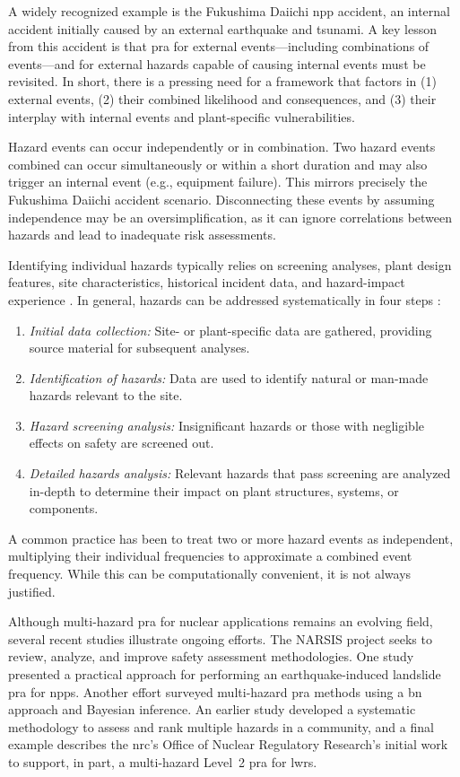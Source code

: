 A widely recognized example is the Fukushima Daiichi \acrshort{npp} accident, an internal accident initially caused by an external earthquake and tsunami. A key lesson from this accident is that \acrshort{pra} for external events---including combinations of events---and for external hazards capable of causing internal events must be revisited. In short, there is a pressing need for a framework that factors in (1) external events, (2) their combined likelihood and consequences, and (3) their interplay with internal events and plant-specific vulnerabilities.

Hazard events can occur independently or in combination. Two hazard events combined can occur simultaneously or within a short duration and may also trigger an internal event (e.g., equipment failure). This mirrors precisely the Fukushima Daiichi accident scenario. Disconnecting these events by assuming independence may be an oversimplification, as it can ignore correlations between hazards and lead to inadequate risk assessments.

Identifying individual hazards typically relies on screening analyses, plant design features, site characteristics, historical incident data, and hazard-impact experience \cite{54}. In general, hazards can be addressed systematically in four steps \cite{55}:

\begin{enumerate}
\item \textit{Initial data collection:} Site- or plant-specific data are gathered, providing source material for subsequent analyses.
\item \textit{Identification of hazards:} Data are used to identify natural or man-made hazards relevant to the site.
\item \textit{Hazard screening analysis:} Insignificant hazards or those with negligible effects on safety are screened out.
\item \textit{Detailed hazards analysis:} Relevant hazards that pass screening are analyzed in-depth to determine their impact on plant structures, systems, or components.
\end{enumerate}

A common practice has been to treat two or more hazard events as independent, multiplying their individual frequencies to approximate a combined event frequency. While this can be computationally convenient, it is not always justified.

Although multi-hazard \acrshort{pra} for nuclear applications remains an evolving field, several recent studies illustrate ongoing efforts. The NARSIS project \cite{56} seeks to review, analyze, and improve safety assessment methodologies. One study \cite{57} presented a practical approach for performing an earthquake-induced landslide \acrshort{pra} for \acrshort{npp}s. Another effort \cite{58} surveyed multi-hazard \acrshort{pra} methods using a \acrshort{bn} approach and Bayesian inference. An earlier study \cite{59} developed a systematic methodology to assess and rank multiple hazards in a community, and a final example \cite{60} describes the \acrshort{nrc}'s Office of Nuclear Regulatory Research's initial work to support, in part, a multi-hazard Level~2 \acrshort{pra} for \acrshort{lwr}s.

